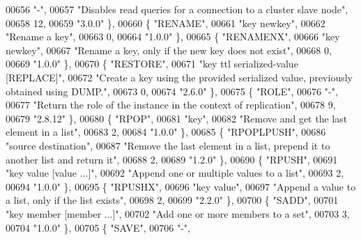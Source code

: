 \begin{DoxyCode}
00656     \textcolor{stringliteral}{"-"},
00657     \textcolor{stringliteral}{"Disables read queries for a connection to a cluster slave node"},
00658     12,
00659     \textcolor{stringliteral}{"3.0.0"} \},
00660     \{ \textcolor{stringliteral}{"RENAME"},
00661     \textcolor{stringliteral}{"key newkey"},
00662     \textcolor{stringliteral}{"Rename a key"},
00663     0,
00664     \textcolor{stringliteral}{"1.0.0"} \},
00665     \{ \textcolor{stringliteral}{"RENAMENX"},
00666     \textcolor{stringliteral}{"key newkey"},
00667     \textcolor{stringliteral}{"Rename a key, only if the new key does not exist"},
00668     0,
00669     \textcolor{stringliteral}{"1.0.0"} \},
00670     \{ \textcolor{stringliteral}{"RESTORE"},
00671     \textcolor{stringliteral}{"key ttl serialized-value [REPLACE]"},
00672     \textcolor{stringliteral}{"Create a key using the provided serialized value, previously obtained using DUMP."},
00673     0,
00674     \textcolor{stringliteral}{"2.6.0"} \},
00675     \{ \textcolor{stringliteral}{"ROLE"},
00676     \textcolor{stringliteral}{"-"},
00677     \textcolor{stringliteral}{"Return the role of the instance in the context of replication"},
00678     9,
00679     \textcolor{stringliteral}{"2.8.12"} \},
00680     \{ \textcolor{stringliteral}{"RPOP"},
00681     \textcolor{stringliteral}{"key"},
00682     \textcolor{stringliteral}{"Remove and get the last element in a list"},
00683     2,
00684     \textcolor{stringliteral}{"1.0.0"} \},
00685     \{ \textcolor{stringliteral}{"RPOPLPUSH"},
00686     \textcolor{stringliteral}{"source destination"},
00687     \textcolor{stringliteral}{"Remove the last element in a list, prepend it to another list and return it"},
00688     2,
00689     \textcolor{stringliteral}{"1.2.0"} \},
00690     \{ \textcolor{stringliteral}{"RPUSH"},
00691     \textcolor{stringliteral}{"key value [value ...]"},
00692     \textcolor{stringliteral}{"Append one or multiple values to a list"},
00693     2,
00694     \textcolor{stringliteral}{"1.0.0"} \},
00695     \{ \textcolor{stringliteral}{"RPUSHX"},
00696     \textcolor{stringliteral}{"key value"},
00697     \textcolor{stringliteral}{"Append a value to a list, only if the list exists"},
00698     2,
00699     \textcolor{stringliteral}{"2.2.0"} \},
00700     \{ \textcolor{stringliteral}{"SADD"},
00701     \textcolor{stringliteral}{"key member [member ...]"},
00702     \textcolor{stringliteral}{"Add one or more members to a set"},
00703     3,
00704     \textcolor{stringliteral}{"1.0.0"} \},
00705     \{ \textcolor{stringliteral}{"SAVE"},
00706     \textcolor{stringliteral}{"-"},

\end{DoxyCode}

